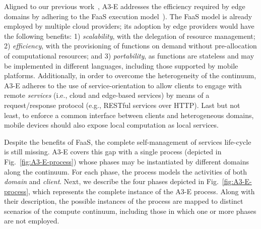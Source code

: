 

Aligned to our previous work~\cite{GarrigaMendonca2017}, A3-E addresses the efficiency required by edge domains by adhering to the FaaS execution model~\cite{MateosFaaster17}). 
The FaaS model is already employed by multiple cloud providers; its adoption by edge providers would have the following benefits: 1) \textit{scalability}, with the delegation of resource management; 2) \textit{efficiency}, with the provisioning of functions on demand without pre-allocation of computational resources; and 3) \textit{portability}, as functions are stateless and may be implemented in different languages, including those supported by mobile platforms. Additionally, in order to overcome the heterogeneity of the continuum, A3-E adheres to the use of service-orientation to allow clients to engage with remote \textit{services} (i.e., cloud and edge-based services) by means of a request/response protocol (e.g., RESTful services over HTTP). Last but not least, to enforce a common interface between clients and heterogeneous domains, mobile devices should also expose local computation as local services. 

Despite the benefits of FaaS, the complete self-management of services life-cycle is still missing. A3-E covers this gap with a single process (depicted in Fig.~\ref{fig:A3-E-process}) whose phases may be instantiated by different domains along the continuum. For each phase, the process models the activities of both \textit{domain} and \textit{client}. Next, we describe the four phases depicted in Fig.~\ref{fig:A3-E-process}, which represents the complete instance of the A3-E process. Along with their description, the possible instances of the process are mapped to distinct scenarios of the compute continuum, including those in which one or more phases are not employed.

